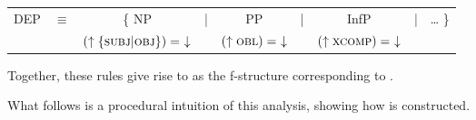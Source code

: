 \documentclass[output=paper]{../langscibook}
\begin{document}
\item\label{ex:pat:prz:17:13:MOD}
  \begin{tabular}[t]{@{}ccc@{\,}c@{~~}c@{~~}c@{~~}c@{~~}c@{~~~}c}
    DEP & $\equiv$ & \{ NP & | & PP & | & InfP & | & … \} \\
    & &  $(\uparrow \textsc{\{subj|obj\}}) =\,\, \downarrow$ & & $(\uparrow
    \textsc{obl}) =\,\, \downarrow$ & & $(\uparrow
    \textsc{xcomp}) =\,\, \downarrow$ & \\
  \end{tabular}
\z
Together, these rules give rise to  as the
f-structure corresponding to .
    ~\hfill  \citep[(19)]{PatejukPrzepiorkowski2017}\smallskip

\noindent
What follows is a procedural intuition of this analysis, showing
how  is constructed.
\end{document}
